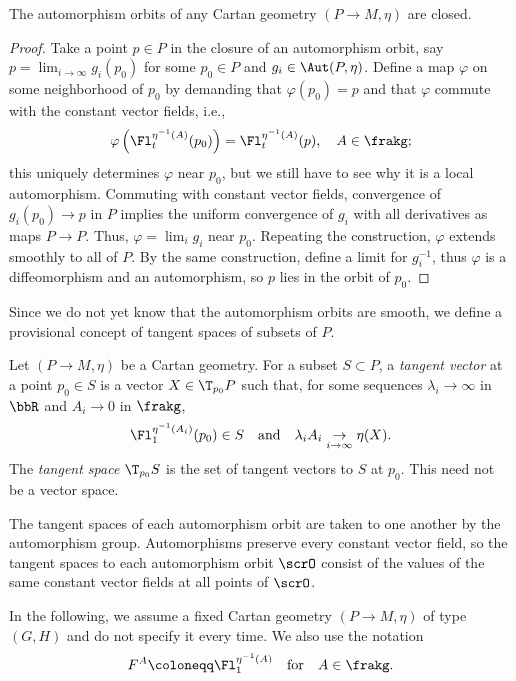 \begin{thm}
    The automorphism orbits of any Cartan geometry $(P\to M,\eta)$ are closed.
\end{thm}
\begin{proof}
    Take a point $p\in P$ in the closure of an automorphism orbit, say $p=\lim_{i\to\infty} g_i(p_0)$ for some $p_0\in P$ and $g_i\in \Aut(P,\eta)$. Define a map $\varphi$ on some neighborhood of $p_0$ by demanding that $\varphi(p_0)=p$ and that $\varphi$ commute with the constant vector fields, i.e., 
    \[\varphi\left(\Fl_t^{\eta^{-1}(A)}(p_0)\right)=\Fl_t^{\eta^{-1}(A)}(p),\quad A\in\frakg;\]
    this uniquely determines $\varphi$ near $p_0$, but we still have to see why it is a local automorphism. Commuting with constant vector fields, convergence of $g_i(p_0)\to p$ in $P$ implies the uniform convergence of $g_i$ with all derivatives as maps $P\to P$. Thus, $\varphi=\lim_i g_i$ near $p_0$. Repeating the construction, $\varphi$ extends smoothly to all of $P$. By the same construction, define a limit for $g_i^{-1}$, thus $\varphi$ is a diffeomorphism and an automorphism, so $p$ lies in the orbit of $p_0$.
\end{proof}


Since we do not yet know that the automorphism orbits are smooth, we define a provisional concept of tangent spaces of subsets of $P$.

\begin{defn}
    Let $(P\to M,\eta)$ be a Cartan geometry. For a subset $S\subset P$, a \emph{tangent vector} at a point $p_0\in S$ is a vector $X\in \T_{p_0}P$ such that, for some sequences $\lambda_i\to\infty$ in $\bbR$ and $A_i\to 0$ in $\frakg$, 
    \[\Fl^{\eta^{-1}(A_i)}_1(p_0)\in S \quad\text{and}\quad \lambda_iA_i\underset{i\to\infty}{\to} \eta(X).\]
    The \emph{tangent space} $\T_{p_0}S$ is the set of tangent vectors to $S$ at $p_0$. This need not be a vector space.
\end{defn}

The tangent spaces of each automorphism orbit are taken to one another by the automorphism group. Automorphisms preserve every constant vector field, so the tangent spaces to each automorphism orbit $\scrO$ consist of the values of the same constant vector fields at all points of $\scrO$. 

In the following, we assume a fixed Cartan geometry $(P\to M,\eta)$ of type $(G,H)$ and do not specify it every time. We also use the notation 
\[F^A\coloneqq \Fl^{\eta^{-1}(A)}_1\quad\text{for}\quad  A\in\frakg.\]

